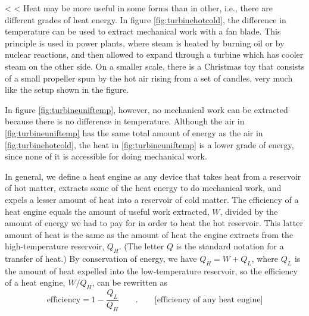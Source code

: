 <%
<%
Heat may be more useful in some forms than in other, i.e.,
there are different grades of heat energy. In figure \ref{fig:turbinehotcold},
the difference in temperature can be used to extract
mechanical work with a fan blade. This principle is used in
power plants, where steam is heated by burning oil or by
nuclear reactions, and then allowed to expand through a
turbine which has cooler steam on the other side. On a
smaller scale, there is a Christmas toy that consists of a
small propeller spun by the hot air rising from a set of
candles, very much like the setup shown in the figure.

In figure \ref{fig:turbineuniftemp}, however, no mechanical work can be extracted
because there is no difference in temperature. Although the
air in \ref{fig:turbineuniftemp} has the same total amount of energy as the air in
\ref{fig:turbinehotcold}, the heat in \ref{fig:turbineuniftemp} is a lower grade of energy, since
none of it is accessible for doing mechanical work.

In general, we define a heat engine as any device that takes
heat from a reservoir of hot matter, extracts some of the
heat energy to do mechanical work, and expels a lesser
amount of heat into a reservoir of cold matter. The
efficiency of a heat engine equals the amount of useful work
extracted, $W$, divided by the amount of energy we had to pay
for in order to heat the hot reservoir. This latter amount
of heat is the same as the amount of heat the engine
extracts from the high-temperature reservoir, $Q_H$. (The
letter $Q$ is the standard notation for a transfer of heat.)
By conservation of energy, we have $Q_H=W+Q_L$, where $Q_L$ is the
amount of heat expelled into the low-temperature reservoir,
so the efficiency of a heat engine, $W/Q_H$, can be rewritten
as
\begin{equation*}
        \text{efficiency}        =  1-\frac{Q_L}{Q_H} \qquad . \qquad \text{[efficiency of any heat
engine]}
\end{equation*}

